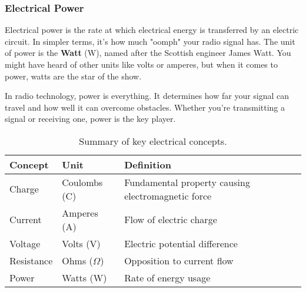 \subsubsection*{Electrical Power}
Electrical power is the rate at which electrical energy is transferred by an electric circuit. In simpler terms, it's how much "oomph" your radio signal has. The unit of power is the \textbf{Watt} (W), named after the Scottish engineer James Watt. You might have heard of other units like volts or amperes, but when it comes to power, watts are the star of the show. 

In radio technology, power is everything. It determines how far your signal can travel and how well it can overcome obstacles. Whether you're transmitting a signal or receiving one, power is the key player.

\begin{table}[h]
    \centering
    \caption{Summary of key electrical concepts.}
    \label{tab:electrical-concepts}
    \begin{tabular}{|l|l|l|}
        \hline
        \textbf{Concept} & \textbf{Unit} & \textbf{Definition} \\
        \hline
        Charge & Coulombs (C) & Fundamental property causing electromagnetic force \\
        Current & Amperes (A) & Flow of electric charge \\
        Voltage & Volts (V) & Electric potential difference \\
        Resistance & Ohms (\(\Omega\)) & Opposition to current flow \\
        Power & Watts (W) & Rate of energy usage \\
        \hline
    \end{tabular}
\end{table}



